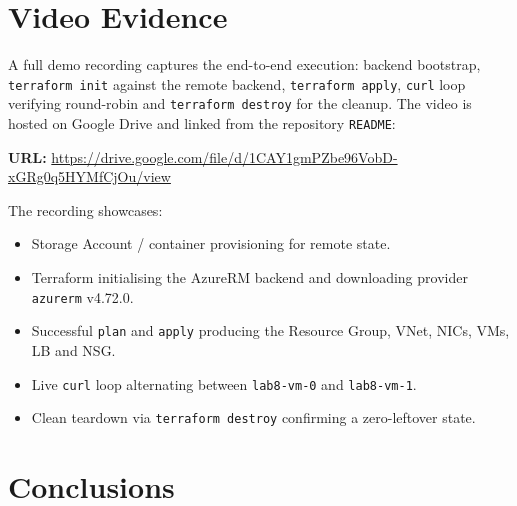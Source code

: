 \documentclass[10pt,a4paper,twocolumn]{article}
\begin{document}
\section{Video Evidence}

A full demo recording captures the end-to-end execution: backend
bootstrap, \texttt{terraform init} against the remote backend,
\texttt{terraform apply}, \texttt{curl} loop verifying round-robin and
\texttt{terraform destroy} for the cleanup. The video is hosted on
Google Drive and linked from the repository \texttt{README}:

\begin{resultbox}[title={Demo recording}]
\textbf{URL:} \url{https://drive.google.com/file/d/1CAY1gmPZbe96VobD-xGRg0q5HYMfCjOu/view}
\medskip

\noindent The recording showcases:
\begin{itemize}
  \item Storage Account / container provisioning for remote state.
  \item Terraform initialising the AzureRM backend and downloading
        provider \texttt{azurerm} v4.72.0.
  \item Successful \texttt{plan} and \texttt{apply} producing the
        Resource Group, VNet, NICs, VMs, LB and NSG.
  \item Live \texttt{curl} loop alternating between
        \texttt{lab8-vm-0} and \texttt{lab8-vm-1}.
  \item Clean teardown via \texttt{terraform destroy} confirming a
        zero-leftover state.
\end{itemize}
\end{resultbox}

\section{Conclusions}
\end{document}
